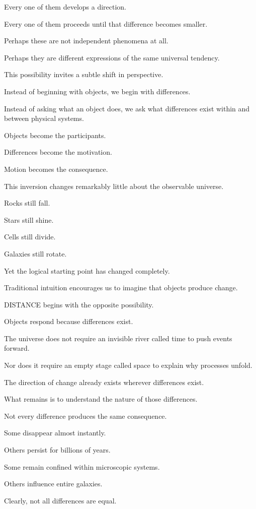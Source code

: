 Every one of them develops a direction.

Every one of them proceeds until that difference becomes smaller.

Perhaps these are not independent phenomena at all.

Perhaps they are different expressions of the same universal tendency.

This possibility invites a subtle shift in perspective.

Instead of beginning with objects, we begin with differences.

Instead of asking what an object does, we ask what differences exist within and between physical systems.

Objects become the participants.

Differences become the motivation.

Motion becomes the consequence.

This inversion changes remarkably little about the observable universe.

Rocks still fall.

Stars still shine.

Cells still divide.

Galaxies still rotate.

Yet the logical starting point has changed completely.

Traditional intuition encourages us to imagine that objects produce change.

DISTANCE begins with the opposite possibility.

Objects respond because differences exist.

The universe does not require an invisible river called time to push events forward.

Nor does it require an empty stage called space to explain why processes unfold.

The direction of change already exists wherever differences exist.

What remains is to understand the nature of those differences.

Not every difference produces the same consequence.

Some disappear almost instantly.

Others persist for billions of years.

Some remain confined within microscopic systems.

Others influence entire galaxies.

Clearly, not all differences are equal.

